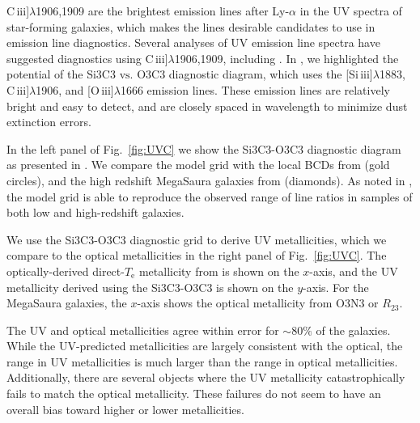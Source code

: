 \documentclass[preprint2]{aastex62}
\newcommand{\oiii}{[O\,{\sc iii}]\xspace}
\newcommand{\SiuIII}{[Si\,{\sc iii}]\xspace}
\newcommand{\ciii}{C\,{\sc iii}]\xspace}
\newcommand\vs{\ensuremath{\mathrm{vs.}}\xspace}
\newcommand{\mage}{{\sc Meg}a{\sc S}a{\sc ura}\xspace}
\newcommand{\Te}{\ensuremath{T_{\mathrm{e}}}\xspace}
\begin{document}
\ciii$\lambda$1906,1909 are the brightest emission lines after Ly-$\alpha$ in the UV spectra of star-forming galaxies, which makes the lines desirable candidates to use in emission line diagnostics. Several analyses of UV emission line spectra have suggested diagnostics using \ciii$\lambda$1906,1909, including \citet{Feltre+2016, Jaskot+2016, Byler+2018}. In \citet{Byler+2018}, we highlighted the potential of the Si3C3 \vs O3C3 diagnostic diagram, which uses the \SiuIII$\lambda$1883, \ciii$\lambda$1906, and \oiii$\lambda$1666 emission lines. These emission lines are relatively bright and easy to detect, and are closely spaced in wavelength to minimize dust extinction errors.

In the left panel of Fig.~\ref{fig:UVC} we show the Si3C3-O3C3 diagnostic diagram as presented in \citet{Byler+2018}. We compare the model grid with the local BCDs from \citet{Berg+2016} (gold circles), and the high redshift \mage galaxies from \citet{Rigby+2018b} (diamonds). As noted in \citet{Byler+2018}, the model grid is able to reproduce the observed range of line ratios in samples of both low and high-redshift galaxies.

We use the Si3C3-O3C3 diagnostic grid to derive UV metallicities, which we compare to the optical metallicities in the right panel of Fig.~\ref{fig:UVC}. The optically-derived direct-\Te metallicity from \citet{Berg+2016} is shown on the $x$-axis, and the UV metallicity derived using the Si3C3-O3C3 is shown on the $y$-axis. For the \mage galaxies, the $x$-axis shows the optical metallicity from O3N3 or $R_{23}$.

The UV and optical metallicities agree within error for ${\sim}80\%$ of the \citet{Berg+2016} galaxies. While the UV-predicted metallicities are largely consistent with the optical, the range in UV metallicities is much larger than the range in optical metallicities. Additionally, there are several objects where the UV metallicity catastrophically fails to match the optical metallicity. These failures do not seem to have an overall bias toward higher or lower metallicities.
\end{document}
